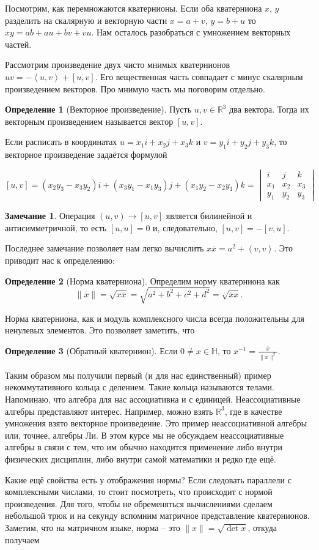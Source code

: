 \documentclass[10pt,a4paper,oneside]{book}
\theoremstyle{definition}
\newtheorem*{rem}{\color{green!50!blue}Замечание}
\newtheorem*{defn}{\color{yellow!30!red} Определение}
\newcommand{\mb}[1]{\mathbb{#1}}
\newcommand{\ovl}{\overline}
\def\lan{\left\langle }
\def\ran{\right\rangle}
\def\dfn{\begin{defn}}
\def\edfn{\end{defn}}
\def\rm{\begin{rem}}
\def\erm{\end{rem}}
\begin{document}
Посмотрим, как перемножаются кватернионы. Если оба кватерниона  $x$, $y$ разделить на скалярную и векторную части $x=a+v$, $y=b+u$ то $xy=ab+au+bv+ vu$. Нам осталось разобраться с умножением векторных частей. 

Рассмотрим произведение двух чисто мнимых кватернионов $uv=-\lan u,v\ran+[u,v]$. Его вещественная часть совпадает с минус скалярным произведением векторов. Про мнимую часть мы поговорим отдельно.

\dfn[Векторное произведение] Пусть $u,v \in \mb R^3$ два вектора. Тогда их векторным произведением называется вектор $[u,v]$.
\edfn

Если расписать в координатах $u=x_1i+x_2j+x_3k$ и  $v=y_1i+y_2j+y_3k$, то векторное произведение задаётся формулой

$$[u,v]= (x_2y_3-x_3y_2)i + (x_3y_1-x_1y_3)j + (x_1y_2- x_2y_1)k= \begin{vmatrix} i& j&k \\ x_1 & x_2 & x_3 \\ y_1 & y_2 & y_3 \end{vmatrix} $$

\rm Операция $(u,v) \to [u,v]$ является билинейной и антисимметричной, то есть $[u,u]=0$ и, следовательно, $[u,v]=-[v,u]$.
\erm

Последнее замечание позволяет нам легко вычислить $x \ovl{x}= a^2+ \lan v,v \ran$. Это приводит нас к определению:

\dfn[Норма кватерниона] Определим норму кватерниона как $$\|x\|=\sqrt{x\ovl{x}}=\sqrt{ a^2+b^2+c^2+d^2}=\sqrt{\ovl{x}x}.$$
\edfn 


Норма кватерниона, как и модуль комплексного числа всегда положительны для ненулевых элементов. Это позволяет заметить, что

\dfn[Обратный кватернион] Если $0\neq x \in \mb H$, то $x^{-1}=\frac{\ovl{x}}{\|x\|^2}$. 
\edfn

Таким образом мы получили первый (и для нас единственный) пример некоммутативного кольца с делением. Такие кольца называются телами. Напоминаю, что алгебра для нас ассоциативна и с единицей. Неассоциативные алгебры представляют интерес. Например, можно взять $\mb R^3$, где в качестве умножения взято векторное произведение. Это пример неассоциативной алгебры или, точнее, алгебры Ли. В этом курсе мы не  обсуждаем неассоциативные алгебры в связи с тем, что им обычно находится применение либо внутри физических дисциплин, либо внутри самой математики и редко где ещё. 

Какие ещё свойства есть у отображения нормы? Если следовать параллели с комплексными числами, то стоит посмотреть, что происходит с нормой произведения. Для того, чтобы не обременяться вычислениями сделаем небольшой трюк и на секунду вспомним матричное представление кватернионов. Заметим, что на матричном языке, норма -- это $\|x\|=\sqrt{\det x}$, откуда получаем
\end{document}
